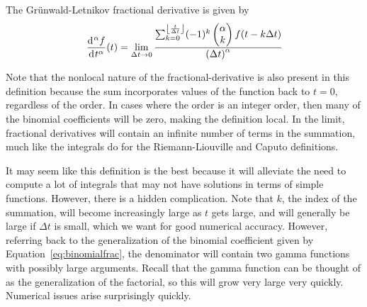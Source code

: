     \begin{definition}
      The Gr\"unwald-Letnikov fractional derivative is given by
      \begin{equation}
	\frac{\operatorname{d}\hspace*{-1pt}^\alpha f}{\operatorname{d}\hspace*{-1pt} t^\alpha} (t) = \lim_{\Delta t \rightarrow 0} \frac{ \sum_{k=0}^{\left\lfloor \frac{t}{\Delta t} \right\rfloor} (-1)^k \begin{pmatrix} \alpha \\ k \end{pmatrix} f(t - k \Delta t) }{\left( \Delta t \right)^\alpha}
      \label{eq:gwdef}
    \end{equation}
      \label{def:gw}
    \end{definition}

  Note that the nonlocal nature of the fractional-derivative is also present in this definition because the sum incorporates values of the function back to $t=0$, regardless of the order. In cases where the order is an integer order, then many of the binomial coefficients will be zero, making the definition local. In the limit, fractional derivatives will contain an infinite number of terms in the summation, much like the integrals do for the Riemann-Liouville and Caputo definitions. 

  \begin{remark}
    It may seem like this definition is the best because it will alleviate the need to compute a lot of integrals that may not have solutions in terms of simple functions. However, there is a hidden complication. Note that $k$, the index of the summation, will become increasingly large as $t$ gets large, and will generally be large if $\Delta t$ is small, which we want for good numerical accuracy. However, referring back to the generalization of the binomial coefficient given by Equation~\ref{eq:binomialfrac}, the denominator will contain two gamma functions with possibly large arguments. Recall that the gamma function can be thought of as the generalization of the factorial, so this will grow very large very quickly. Numerical issues arise surprisingly quickly.
  \end{remark}
